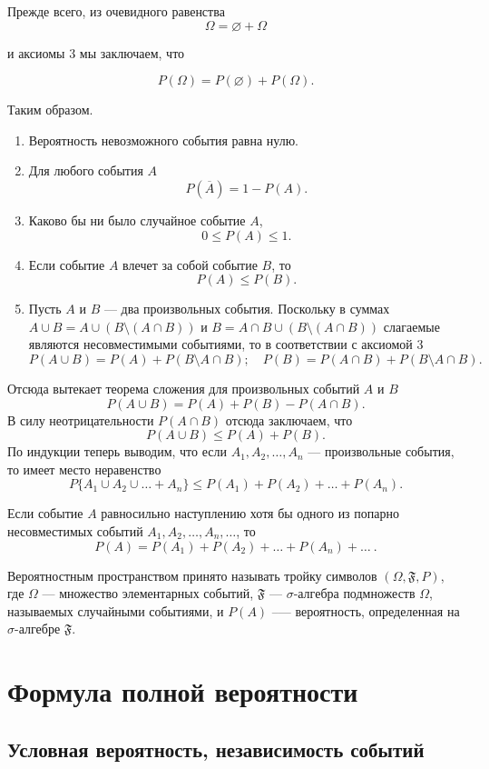 Прежде всего, из очевидного равенства
$$
\Omega = \varnothing + \Omega
$$

и аксиомы 3 мы заключаем, что

$$
P(\Omega) = P(\varnothing) + P(\Omega).
$$

Таким образом.
\begin{enumerate}
\item
Вероятность невозможного события равна нулю.
\item	
Для любого события $A$
$$
P(\overline{A}) = 1 - P(A).
$$
\item
Каково бы ни было случайное событие $A$,
$$
0 \le P(A) \le 1.
$$
\item
Если событие $A$ влечет за собой событие $B$, то
$$
P(A) \le P(B).
$$
\item
Пусть $A$ и $B$ --- два произвольных события. Поскольку в суммах $A \cup B = A \cup (B \setminus (A\cap B))$ и $B = A\cap B \cup (B \setminus (A\cap B))$ слагаемые являются несовместимыми событиями, то в соответствии с аксиомой 3
$$
P(A \cup B) = P(A) + P(B \setminus A\cap B);\quad P(B) = P(A\cap B) + P(B \setminus A\cap B).
$$
\end{enumerate}

Отсюда вытекает теорема сложения для произвольных событий $A$ и $B$
$$
P(A \cup B) = P(A) + P(B) - P(A\cap B).
$$
В силу неотрицательности $P(A\cap B)$ отсюда заключаем, что
$$
P(A \cup B) \le P(A) + P(B).
$$
По индукции теперь выводим, что если $A_1,A_2, \ldots,A_n$ --- произвольные события, то имеет место неравенство
$$
P\{ A_1 \cup A_2 \cup \ldots + A_n \} \le P(A_1) + P(A_2) + \ldots + P(A_n).
$$
\begin{axiome}
 Если событие $A$ равносильно наступлению хотя бы одного из попарно несовместимых событий $A_1,A_2,\ldots,A_n,\ldots$, то
$$
P(A) = P(A_1) + P(A_2) + \ldots + P(A_n) + \ldots \: .
$$
\end{axiome}
Вероятностным пространством принято называть тройку символов $(\Omega, \mathfrak{F}, P)$, где $\Omega$ --- множество элементарных событий, $\mathfrak{F}$ — $\sigma$-алгебра подмножеств $\Omega$, называемых случайными событиями, и $P(A)$ --— вероятность, определенная на $\sigma$-алгебре $\mathfrak{F}$.

\section{Формула полной вероятности}
\subsection{Условная вероятность, независимость событий}

